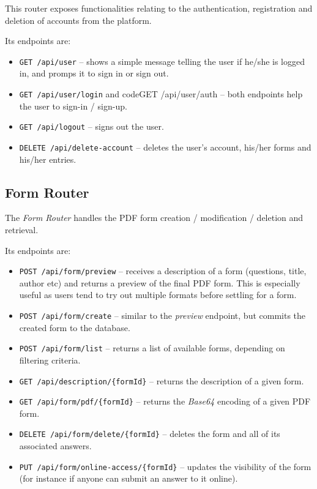 \documentclass[12pt, a4paper]{report}
\def\code#1{\texttt{#1}}
\begin{document}
This router exposes functionalities relating to the authentication, registration and deletion of accounts from the platform.

Its endpoints are:
\begin{itemize}
    \item \code{GET /api/user} -- shows a simple message telling the user if he/she is logged in, and promps it to sign in or sign out.
    \item \code{GET /api/user/login} and code{GET /api/user/auth} -- both endpoints help the user to sign-in / sign-up.
    \item \code{GET /api/logout} -- signs out the user.
    \item \code{DELETE /api/delete-account} -- deletes the user's account, his/her forms and his/her entries.
\end{itemize}

\subsection{Form Router}

The \textit{Form Router} handles the PDF form creation / modification / deletion and retrieval.

Its endpoints are:
\begin{itemize}
    \item \code{POST /api/form/preview} -- receives a description of a form (questions, title, author etc) and returns a preview of the final PDF form. This is especially useful as users tend to try out multiple formats before settling for a form.
    \item \code{POST /api/form/create} -- similar to the \textit{preview} endpoint, but commits the created form to the database.
    \item \code{POST /api/form/list} -- returns a list of available forms, depending on filtering criteria.
    \item \code{GET /api/description/\{formId\}} -- returns the description of a given form.
    \item \code{GET /api/form/pdf/\{formId\}} -- returns the \textit{Base64} encoding of a given PDF form.
    \item \code{DELETE /api/form/delete/\{formId\}} -- deletes the form and all of its associated answers.
    \item \code{PUT /api/form/online-access/\{formId\}} -- updates the visibility of the form (for instance if anyone can submit an answer to it online).
\end{itemize}
\end{document}
